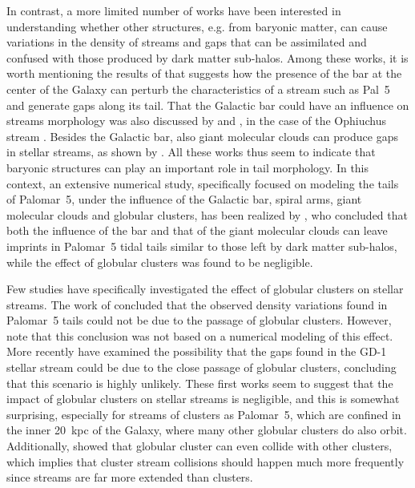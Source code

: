 \documentclass{aa}
\begin{document}
  In contrast, a more limited number of works have been interested in understanding whether other structures, e.g. from baryonic matter, can cause variations in the density of streams and gaps that can be assimilated and confused with those produced by dark matter sub-halos.  Among these works, it is worth mentioning the results of \citet{2017NatAs...1..633P} that suggests how the presence of the bar at the center of the Galaxy can perturb the characteristics of a stream such as Pal~5 and generate gaps along its tail. That the Galactic bar could have an influence on streams morphology was also discussed by \citet{2016MNRAS.460..497H} and \citet{2016ApJ...824..104P}, in the case of the Ophiuchus stream \citep{2014MNRAS.443L..84B}. Besides the Galactic bar, also giant molecular clouds can produce gaps in stellar streams, as shown by \citet{2016MNRAS.463L..17A}. All these works thus seem to indicate that baryonic structures can play an important role in tail morphology. In this context,  an extensive numerical study, specifically focused on modeling the tails of Palomar~5, under the influence of the Galactic bar, spiral arms, giant molecular clouds and globular clusters, has been realized by \citet{2019MNRAS.484.2009B}, who concluded that both the influence of the bar and that of the giant molecular clouds can leave imprints in Palomar~5 tidal tails similar to those left by dark matter sub-halos, while the effect of globular clusters was found to be negligible. 
  
  Few studies have specifically investigated the effect of globular clusters on stellar streams. The work of \citet{2017MNRAS.470...60E} concluded that the observed density variations found in Palomar~5 tails could not be due to the passage of globular clusters. However, note that this conclusion was not based on a numerical modeling of this effect. More recently \citet{2022ApJ...941..129D} have examined the possibility that the gaps found in the GD-1 stellar stream could be due to the close passage of globular clusters, concluding that this scenario is highly unlikely. These first works seem to suggest that the impact of globular clusters on stellar streams is negligible, and this is somewhat surprising, especially for streams of clusters as Palomar~5, which are confined in the inner 20~kpc of the Galaxy, where many other globular clusters do also orbit. Additionally, \citet{2023A&A...678A..69I} showed that globular cluster can even collide with other clusters, which implies that cluster stream collisions should happen much more frequently since streams are far more extended than clusters. 
  
\end{document}
